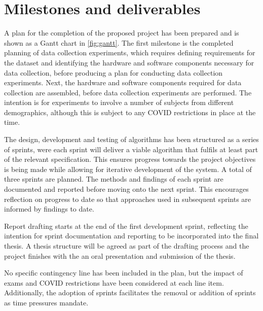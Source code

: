 \documentclass[11pt, parskip=half*,twoside=false]{scrbook}
\begin{document}
{\section{Milestones and deliverables}

A plan for the completion of the proposed project has been prepared and is shown as a Gantt chart in \cref{fig:gantt}. The first milestone is the completed planning of data collection experiments, which requires defining requirements for the dataset and identifying the hardware and software components necessary for data collection, before producing a plan for conducting data collection experiments. Next, the hardware and software components required for data collection are assembled, before data collection experiments are performed. The intention is for experiments to involve a number of subjects from different demographics, although this is subject to any COVID restrictions in place at the time.  

The design, development and testing of algorithms has been structured as a series of sprints, were each sprint will deliver a viable algorithm that fulfils at least part of the relevant specification. This ensures progress towards the project objectives is being made while allowing for iterative development of the system. A total of three sprints are planned. The methods and findings of each sprint are documented and reported before moving onto the next sprint. This encourages reflection on progress to date so that approaches used in subsequent sprints are informed by findings to date.  

Report drafting starts at the end of the first development sprint, reflecting the intention for sprint documentation and reporting to be incorporated into the final thesis. A thesis structure will be agreed as part of the drafting process and the project finishes with the an oral presentation and submission of the thesis.

No specific contingency line has been included in the plan, but the impact of exams and COVID restrictions have been considered at each line item. Additionally, the adoption of sprints facilitates the removal or addition of sprints as time pressures mandate. 

\begin{landscape}	
	\begin{figure}


\end{figure}
\end{landscape}}
\end{document}
